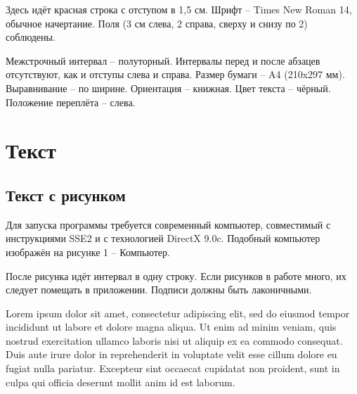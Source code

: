 \intro
Здесь идёт красная строка с отступом в 1,5 см. Шрифт – Times New Roman 14, обычное начертание. Поля (3 см слева, 2 справа, сверху и снизу по 2) соблюдены.

Межстрочный интервал – полуторный. Интервалы перед и после абзацев отсутствуют, как и отступы слева и справа. Размер бумаги – A4 (210x297 мм). Выравнивание – по ширине. Ориентация – книжная. Цвет текста – чёрный. Положение переплёта – слева.
\newpage

\section{Текст}
\subsection{Текст с рисунком}
Для запуска программы требуется современный компьютер, совместимый с инструкциями SSE2 и с технологией DirectX 9.0c. Подобный компьютер изображён на рисунке 1 -- Компьютер.


После рисунка идёт интервал в одну строку. Если рисунков в работе много, их следует помещать в приложении. Подписи должны быть лаконичными.

\newpage
\conclusion

Lorem ipsum dolor sit amet, consectetur adipiscing elit, sed do eiusmod tempor incididunt ut labore et dolore magna aliqua. Ut enim ad minim veniam, quis nostrud exercitation ullamco laboris nisi ut aliquip ex ea commodo consequat. Duis aute irure dolor in reprehenderit in voluptate velit esse cillum dolore eu fugiat nulla pariatur. Excepteur sint occaecat cupidatat non proident, sunt in culpa qui officia deserunt mollit anim id est laborum.
